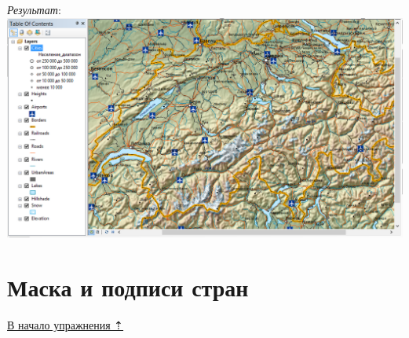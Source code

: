 \documentclass[]{book}
\theoremstyle{definition}
\theoremstyle{definition}
\theoremstyle{definition}
\theoremstyle{remark}
\begin{document}
\begin{enumerate}
  \emph{Результат}: \includegraphics{images/Ex04/image22.png}
\end{enumerate}

\hypertarget{map-design-general-mask}{%
\section{Маска и подписи стран}\label{map-design-general-mask}}

\protect\hyperlink{map-design-general}{В начало упражнения ⇡}
\end{document}

